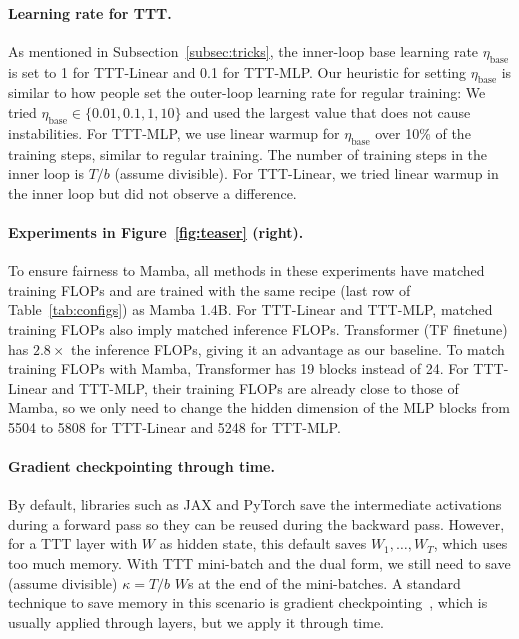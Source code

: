 \documentclass{article}
\begin{document}
\paragraph{Learning rate for TTT.}
As mentioned in Subsection~\ref{subsec:tricks}, the inner-loop base learning rate $\eta_\text{base}$ is set to 1 for TTT-Linear and 0.1 for TTT-MLP.
Our heuristic for setting $\eta_\text{base}$ is similar to how people set the outer-loop learning rate for regular training: We tried $\eta_\text{base} \in \{0.01, 0.1, 1, 10\}$ and used the largest value that does not cause instabilities.
For TTT-MLP, we use linear warmup for $\eta_\text{base}$ over 10\% of the training steps, similar to regular training. 
The number of training steps in the inner loop is $T / b$ (assume divisible).
For TTT-Linear, we tried linear warmup in the inner loop but did not observe a difference.

\paragraph{Experiments in Figure~\ref{fig:teaser} (right).} To ensure fairness to Mamba, all methods in these experiments have matched training FLOPs and are trained with the same recipe (last row of Table~\ref{tab:configs}) as Mamba 1.4B.
For TTT-Linear and TTT-MLP, matched training FLOPs also imply matched inference FLOPs.
Transformer (TF finetune) has $2.8\times$ the inference FLOPs, giving it an advantage as our baseline.
To match training FLOPs with Mamba, Transformer has 19 blocks instead of 24. 
For TTT-Linear and TTT-MLP, their training FLOPs are already close to those of Mamba, so we only need to change the hidden dimension of the MLP blocks from 5504 to 5808 for TTT-Linear and 5248 for TTT-MLP.

\paragraph{Gradient checkpointing through time.} 
By default, libraries such as JAX and PyTorch save the intermediate activations during a forward pass so they can be reused during the backward pass.
However, for a TTT layer with $W$ as hidden state, this default saves $W_1,\dots,W_T$, which uses too much memory.
With TTT mini-batch and the dual form, we still need to save (assume divisible) $\kappa = T/b$ $W$s at the end of the mini-batches.
A standard technique to save memory in this scenario is gradient checkpointing~\cite{chen2016training}, which is usually applied through layers, but we apply it through time.
\end{document}
